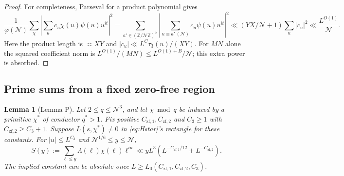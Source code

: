 \documentclass[11pt]{article}
\newtheorem{lemma}[theorem]{Lemma}
\theoremstyle{definition}
\newcommand{\Z}{\mathbb Z}
\newcommand{\ph}{\varphi}
\newcommand{\GN}{\mathcal N}
\theoremstyle{remark}
\numberwithin{equation}{section}
\begin{document}
\begin{proof}
For completeness, Parseval for a product polynomial gives
\begin{equation}\label{eq:trivial-energy}
 \frac1{\ph(\GN)}\sum_\chi
 \left|\sum_u c_u\chi(u)\psi(u)u^{it}\right|^2
 =\sum_{a'\in(\Z/\GN\Z)^\times}
      \left|\sum_{u\equiv a'\ (\GN)}c_u\psi(u)u^{it}\right|^2
 \ll(YX/\GN+1)\sum_u|c_u|^2
 \ll\frac{L^{O(1)}}{\GN}.
\end{equation}
Here the product length is $\asymp XY$ and
$|c_u|\ll L^{C}\tau_3(u)/(XY)$.
For $MN$ alone the squared coefficient norm is
$L^{O(1)}/(MN)\le L^{O(1)+B}/\GN$; this extra power is absorbed.
\end{proof}

\subsection{Prime sums from a fixed zero-free region}\label{subsec:P}
\begin{lemma}[Lemma P]\label{lem:P}
Let $2\le q\le\GN^3$, and let $\chi\bmod q$ be induced by a
primitive $\chi^*$ of conductor $q^*>1$.
Fix positive $C_{\mathrm{zf},1},C_{\mathrm{zf},2}$ and
$C_3\ge1$ with $C_{\mathrm{zf},2}\ge C_3+1$.
Suppose $L(s,\chi^*)\ne0$ in
\eqref{eq:Hstar}'s rectangle for these constants.
For $|u|\le L^{C_3}$ and $\GN^{1/6}\le y\le\GN$,
\begin{equation}\label{eq:P}
 S(y):=\sum_{\ell\le y}\Lambda(\ell)\chi(\ell)\ell^{iu}
 \ll yL^3(L^{-C_{\mathrm{zf},1}/12}+L^{-C_{\mathrm{zf},2}}).
\end{equation}
The implied constant can be absolute once
$L\ge L_0(C_{\mathrm{zf},1},C_{\mathrm{zf},2},C_3)$.
\end{lemma}
\end{document}
